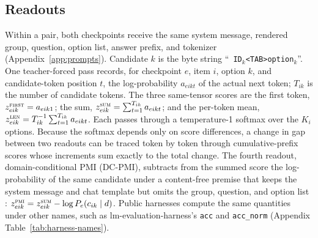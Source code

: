 \documentclass[11pt]{article}
\begin{document}
\subsection{Readouts}
\label{sec:reductions}

Within a pair, both checkpoints receive the same system message, rendered
group, question, option list, answer prefix, and tokenizer
(Appendix~\ref{app:prompts}). Candidate $k$ is the byte string
``\texttt{ ID$_k$<TAB>option$_k$}''. One teacher-forced pass records,
for checkpoint $e$, item $i$, option $k$, and candidate-token position $t$,
the log-probability $a_{eikt}$ of the actual next token; $T_{ik}$ is the
number of candidate tokens. The three same-tensor scores are the first token, $z^{\textsc{first}}_{eik}=a_{eik1}$; the sum, $z^{\textsc{sum}}_{eik}=\sum_{t=1}^{T_{ik}} a_{eikt}$; and the per-token mean, $z^{\textsc{len}}_{eik}=T_{ik}^{-1}\sum_{t=1}^{T_{ik}} a_{eikt}$. Each passes through a temperature-1 softmax over the $K_i$ options. Because the softmax depends only on score differences, a change in gap between two readouts can be traced token by token through cumulative-prefix scores whose increments sum exactly to the total change. The fourth readout, domain-conditional PMI (DC-PMI), subtracts from the summed score the log-probability of the same candidate under a content-free premise that keeps the system message and chat template but omits the group, question, and option list \citep{holtzman-etal-2021-surface,zhao2021calibrate}: $z^{\textsc{pmi}}_{eik}=z^{\textsc{sum}}_{eik}-\log P_e(c_{ik}\mid d)$. Public harnesses compute the same quantities under other names, such as lm-evaluation-harness's \texttt{acc} and \texttt{acc\_norm} (Appendix Table~\ref{tab:harness-names}).
\end{document}
